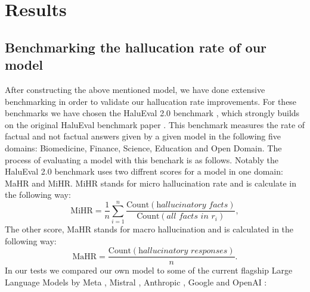 \documentclass[10pt,leqno,twoside]{article}
\begin{document}
\section{Results}

\subsection{Benchmarking the hallucation rate of our model}


After constructing the above mentioned model, we have done extensive benchmarking in order to validate our hallucation rate improvements. For these benchmarks we have chosen the HaluEval 2.0 benchmark \cite{li2024dawn}, which strongly builds on the original HaluEval benchmark paper \cite{li2023halueval}. This benchmark measures the rate of factual and not factual answers given by a given model in the following five domains: Biomedicine, Finance, Science, Education and Open Domain.   The process of evaluating a model with this benchark is as follows. Notably the HaluEval 2.0 benchmark uses two diffrent scores for a model in one domain: MaHR and MiHR. MiHR stands for micro hallucination rate and is calculate in the following way: 
\[
\text{MiHR} = \frac{1}{n} \sum_{i=1}^{n} 
\frac{\text{Count}(\textit{hallucinatory facts})}
{\text{Count}(\textit{all facts in } r_i)},
\]
The other score, MaHR stands for macro hallucination and is calculated in the following way:
\[
\text{MaHR} = \frac{\text{Count}(\textit{hallucinatory responses})}{n}.
\]
 In our tests we compared our own model to some of the current flagship Large Language Models by Meta \cite{Llama}, Mistral \cite{Mistral}, Anthropic \cite{Anthropic}, Google \cite{Gemini} and OpenAI \cite{OpenAI}:
\end{document}
